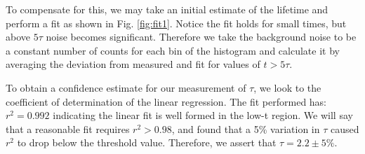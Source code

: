 \documentclass[12pt,twocolumn]{article}
\begin{document}
To compensate for this, we may take an initial estimate of the lifetime and perform a fit as shown in Fig. \ref{fig:fit1}.
Notice the fit holds for small times, but above $5\tau$ noise becomes significant. Therefore we take the background noise to be
a constant number of counts for each bin of the histogram and calculate it by averaging the deviation from measured and fit
for values of $t>5\tau$.

To obtain a confidence estimate for our measurement of $\tau$, we look to the coefficient of determination of the linear
regression. The fit performed has: $r^{2}=0.992$ indicating the linear fit is well formed in the low-t region. We will say
that a reasonable fit requires $r^{2}>0.98$, and found that a 5\% variation in $\tau$ caused $r^{2}$ to drop below the 
threshold value. Therefore, we assert that $\tau=2.2\pm5\%$.

\nocite{*}


\end{document}
